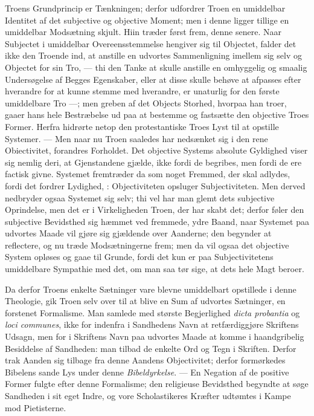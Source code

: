 \documentclass[12pt]{book}
\newcommand{\dsi}{\reflectbox{c}:}
\newcommand{\opage}[1]{\marginnote{\footnotesize\textit{[#1]}}}
\begin{document}
Troens Grundprincip er Tænkningen; derfor udfordrer Troen en umiddelbar
Identitet af det subjective og objective Moment; men i denne ligger tillige en
umiddelbar Modsætning skjult. Hiin træder først frem, denne senere. Naar
Subjectet i umiddelbar Overeensstemmelse hengiver sig til Objectet, falder det
ikke den Troende ind, at anstille en udvortes Sammenligning imellem sig selv
og Objectet for sin Tro, --- thi den Tanke at skulle anstille en omhyggelig og
smaalig Undersøgelse af Begges Egenskaber, eller at disse skulle behøve at
afpasses efter hverandre for at kunne stemme med hverandre, er unaturlig for
den første umiddelbare Tro ---; men greben af det Objects Storhed, hvorpaa han
troer, gaaer hans hele Bestræbelse ud paa at bestemme og fastsætte den
objective Troes Former. Herfra hidrørte netop den protestantiske Troes Lyst
til at opstille Systemer. --- Men naar nu Troen saaledes har nedsænket sig i
den rene Obiectivitet, forandres Forholdet. Det objective Systems absolute
Gyldighed viser sig nemlig deri, at Gjenstandene gjælde, ikke fordi de
begribes, men fordi de ere factisk givne. Systemet fremtræder da som noget
Fremmed, der skal adlydes, fordi det fordrer Lydighed, \dsi{} Objectiviteten
opsluger Subjectiviteten. Men derved nedbryder ogsaa Systemet sig selv; thi
vel har man glemt dets subjective Oprindelse, men det er i Virkeligheden
Troen, der har skabt det; derfor føler den subjective Bevidsthed sig hæmmet
ved fremmede, ydre Baand, naar Systemet paa udvortes Maade vil gjøre sig
gjældende over Aanderne; den begynder at reflectere, og nu træde
Modsætningerne frem; men da vil ogsaa det objective System opløses og gaae til
Grunde,
\opage{86} %
fordi det kun er paa Subjectivitetens umiddelbare Sympathie med det, om man
saa tør sige, at dets hele Magt beroer.

Da derfor Troens enkelte Sætninger vare blevne umiddelbart opstillede i denne
Theologie, gik Troen selv over til at blive en Sum af udvortes Sætninger, en
forstenet Formalisme. Man samlede med største Begjerlighed \textit{dicta
probantia} og \textit{loci communes}, ikke for indenfra i Sandhedens Navn at
retfærdiggjøre Skriftens Udsagn, men for i Skriftens Navn paa udvortes Maade
at komme i haandgribelig Besiddelse af Sandheden: man tilbad de enkelte Ord og
Tegn i Skriften. Derfor trak Aanden sig tilbage fra denne Aandens
Objectivitet; derfor formørkedes Bibelens sande Lys under denne
\emph{Bibeldyrkelse}. --- En Negation af de positive Former fulgte efter denne
Formalisme; den religieuse Bevidsthed begyndte at søge Sandheden i sit eget
Indre, og vore Scholastikeres Kræfter udtømtes i Kampe mod Pietisterne.
\end{document}
